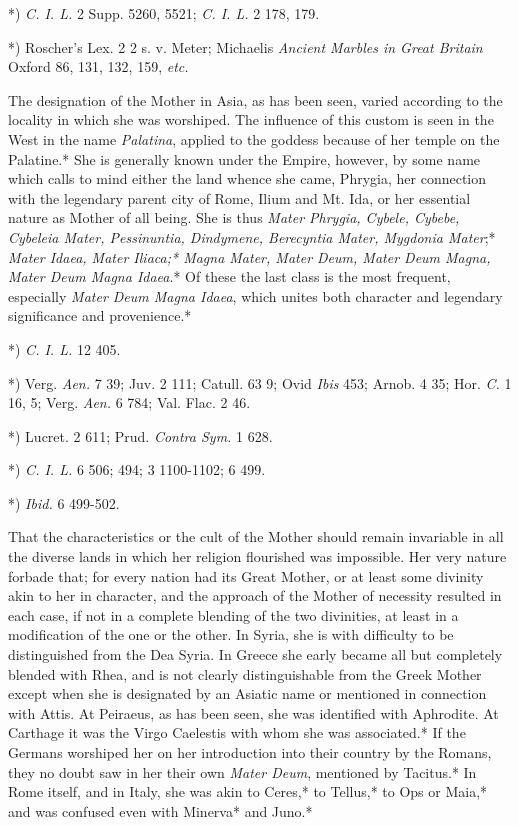 \documentclass[a4paper, 11pt, oneside, polutonikogreek, english]{article}
\begin{document}
*) \emph{C. I. L.} 2 Supp. 5260, 5521; \emph{C. I. L.} 2 178, 179.

*) Roscher's Lex. 2 2 s. v. Meter; Michaelis \emph{Ancient Marbles in Great Britain} Oxford 86, 131, 132, 159, \emph{etc.}

The designation of the Mother in Asia, as has been seen, varied according to the locality in which she was worshiped. The influence of this custom is seen in the West in the name \emph{Palatina}, applied to the goddess because of her temple on the Palatine.* She is generally known under the Empire, however, by some name which calls to mind either the land whence she came, Phrygia, her connection with the legendary parent city of Rome, Ilium and Mt. Ida, or her essential nature as Mother of all being. She is thus \emph{Mater Phrygia, Cybele, Cybebe, Cybeleia Mater, Pessinuntia, Dindymene, Berecyntia Mater, Mygdonia Mater};* \emph{Mater Idaea, Mater Iliaca;* Magna Mater, Mater Deum, Mater Deum Magna, Mater Deum Magna Idaea}.* Of these the last class is the most frequent, especially \emph{Mater Deum Magna Idaea}, which unites both character and legendary significance and provenience.*

*) \emph{C. I. L.} 12 405.

*) Verg. \emph{Aen.} 7 39; Juv. 2 111; Catull. 63 9; Ovid \emph{Ibis} 453; Arnob. 4 35; Hor. \emph{C.} 1 16, 5; Verg. \emph{Aen.} 6 784; Val. Flac. 2 46.

*) Lucret. 2 611; Prud. \emph{Contra Sym.} 1 628.

*) \emph{C. I. L.} 6 506; 494; 3 1100-1102; 6 499.

*) \emph{Ibid.} 6 499-502.

That the characteristics or the cult of the Mother should remain invariable in all the diverse lands in which her religion flourished was impossible. Her very nature forbade that; for every nation had its Great Mother, or at least some divinity akin to her in character, and the approach of the Mother of necessity resulted in each case, if not in a complete blending of the two divinities, at least in a modification of the one or the other. In Syria, she is with difficulty to be distinguished from the Dea Syria. In Greece she early became all but completely blended with Rhea, and is not clearly distinguishable from the Greek Mother except when she is designated by an Asiatic name or mentioned in connection with Attis. At Peiraeus, as has been seen, she was identified with Aphrodite. At Carthage it was the Virgo Caelestis with whom she was associated.* If the Germans worshiped her on her introduction into their country by the Romans, they no doubt saw in her their own \emph{Mater Deum}, mentioned by Tacitus.* In Rome itself, and in Italy, she was akin to Ceres,* to Tellus,* to Ops or Maia,* and was confused even with Minerva* and Juno.*
\end{document}
